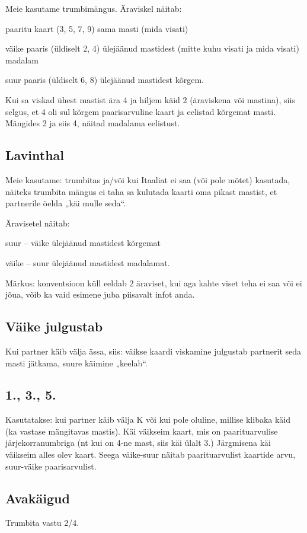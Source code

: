 \documentclass[10pt]{article}
\begin{document}
\begin{multicols*}{2}
Meie kasutame trumbimängus.
Äraviskel näitab:

paaritu kaart (3, 5, 7, 9)	 sama masti (mida visati)

väike paaris (üldiselt 2, 4)	 ülejäänud mastidest (mitte kuhu visati ja mida visati) madalam

suur paaris (üldiselt 6, 8)	 ülejäänud mastidest kõrgem.

Kui sa viskad ühest mastist ära 4 ja hiljem käid 2 (äraviskena või mastina),
siis selgus, et 4 oli sul kõrgem paarisarvuline kaart ja eelistad kõrgemat
masti. Mängides 2 ja siis 4, näitad madalama eelistust.

\subsection{Lavinthal}

Meie kasutame: trumbitas ja/või kui Itaaliat ei saa (või pole mõtet) kasutada, näiteks trumbita mängus ei taha sa kulutada kaarti oma pikast mastist, et partnerile öelda „käi mulle seda“.

Äravisetel näitab:

suur – väike ülejäänud mastidest kõrgemat

väike – suur ülejäänud mastidest madalamat.

Märkus: konventsioon küll eeldab 2 äraviset, kui aga kahte viset teha ei saa või ei jõua, võib ka vaid esimene juba piisavalt infot anda.

\subsection{Väike julgustab}

Kui partner käib välja ässa, siis: väikse kaardi viskamine julgustab partnerit seda masti jätkama, suure käimine „keelab“.

\subsection{1., 3., 5.}

Kasutatakse: kui partner käib välja K või kui pole oluline, millise klibaka käid (ka vastase mängitavas mastis). Käi väikseim kaart, mis on paarituarvulise järjekorranumbriga (nt kui on 4-ne mast, siis käi ülalt 3.) Järgmisena käi väikseim alles olev kaart. Seega väike-suur näitab paarituarvulist kaartide arvu, suur-väike paarisarvulist.

\subsection{Avakäigud}
Trumbita vastu 2/4.


\end{multicols*}
\end{document}
